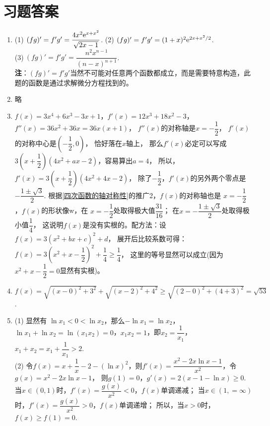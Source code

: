 \section{习题答案}
\begin{enumerate}[label={\textbf{\arabic*.}},leftmargin=
    \inteval{\myenumleftmargin}pt]
\item (1)$\ (fg)'=f'g'=\dfrac{4x^2\e^{x+x^2}}{\sqrt{2x-1}} $. \quad
(2)$\ (fg)'=f'g'=(1+x)^2\mathrm{e}^{2x+x^2/2} $. \\
(3)$\ (fg)'=f'g'=\dfrac{n^2x^{n-1}}{(n-x)^{n+1}} $. \\
\textbf{注}：$ (fg)'=f'g' $当然不可能对任意两个函数都成立，而是需要特意构造，此题的函数是通过求解微分方程找到的。

\item 略

\item $ f(x)=3x^4+6x^3-3x+1 $，$ f'(x)=12x^3+18x^2-3 $，
$ f''(x)=36x^2+36x=36x(x+1) $，
$ f''(x) $的对称轴是$ x=-\dfrac{1}{2} $，
$ f'(x) $的对称中心是$ \left(-\dfrac{1}{2},0\right) $，
恰好落在$ x $轴上，
那么$ f'(x) $必定可以写成$ 3\left(x+
\dfrac{1}{2}\right)(4x^2+ax-2) $，容易算出$ a=4 $，
所以，$ f'(x)=3\left(x+\dfrac{1}{2}\right)(4x^2+4x-2) $，
除了$ -\dfrac{1}{2} $，$ f'(x) $的另外两个零点是
$ -\dfrac{1\pm \sqrt{3}}{2} $. 
根据\ref{四次函数的轴对称性}的推广2，$ f(x) $的对称轴也是
$ x=-\dfrac{1}{2} $，$ f(x) $的形状像w，在
$ x=-\dfrac{1}{2} $处取得极大值$ \dfrac{31}{16} $；
在$ x=-\dfrac{1\pm \sqrt{3}}{2} $处取得极小值$ \dfrac{1}{4} $，
这说明$ f(x) $是没有实根的。配方法：设$ f(x)=3(x^2+bx+c)^2+d $，
展开后比较系数可得：$ f(x)=3\left(x^2+x-
\dfrac{1}{2}\right)^2+\dfrac{1}{4}\geq \dfrac{1}{4} $，
这里的等号显然可以成立(因为$ x^2+x-\dfrac{1}{2}=0 $显然有实根)。

\item $ f(x)=\sqrt{(x-0)^2+3^2}+\sqrt{(x-2)^2+4^2}\geq 
\sqrt{(2-0)^2+(4+3)^2} =\sqrt{53} $.

\item (1) 显然有 $ \ln x_1<0<\ln x_2 $，那么$ -\ln x_1=\ln x_2 $，
$ \ln x_1+\ln x_2=\ln(x_1x_2)=0 $，$ x_1x_2=1 $，即$ x_2=\dfrac{1}{x_1} $，
$ x_1+x_2=x_1+\dfrac{1}{x_1}>2 $. \\

(2) 令$f(x)=x+\dfrac{1}{x}-2-(\ln x)^2$，则$ f'(x)=
\dfrac{x^2-2x\ln x-1}{x^2} $，令$g(x)=x^2-2x\ln x-1$，
则$g(1)=0$，$g'(x)=2(x-1-\ln x)\geq 0$.
当$x\in(0,1)$时，$f'(x)=\dfrac{g(x)}{x^2}<0$，$f(x)$单调递减；
当$x\in(1,=\infty)$时，$f'(x)=\dfrac{g(x)}{x^2}>0$，$f(x)$单调递增；
所以，当$x>0$时，$f(x)\geq f(1)=0$.


\end{enumerate}
